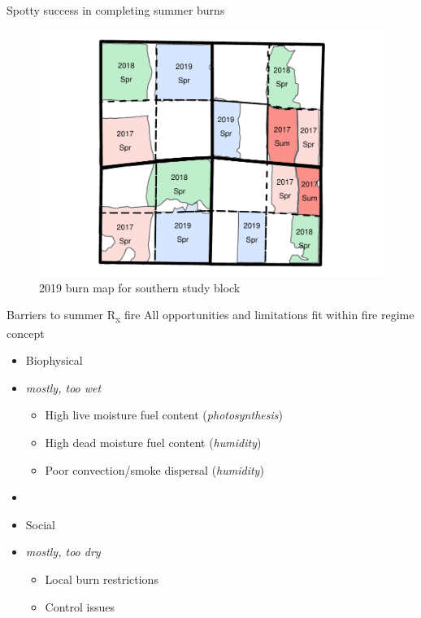 \documentclass[11pt]{beamer}
\begin{document}
\begin{frame}{Spotty success in completing summer burns}

	\begin{center}
		\begin{figure}
			\includegraphics[width=0.9\linewidth]{figs/BarkerBurns-1} 
			\caption{2019 burn map for southern study block}
		\end{figure}
	\end{center}
\end{frame}

\begin{frame}{Barriers to summer R\textsubscript{x} fire } 
	All opportunities and limitations fit within fire regime concept
	\begin{itemize}
		\item Biophysical 
		\item[] \emph{mostly, \alert{too wet}}
		\begin{itemize}
			\item High live moisture fuel content (\emph{photosynthesis})
			\item High dead moisture fuel content (\emph{humidity})
			\item Poor convection/smoke dispersal (\emph{humidity})
		\end{itemize}
		\item[]
		\item Social 
		\item[] \emph{mostly, \alert{too dry}}
		\begin{itemize}
			\item Local burn restrictions
			\item Control issues
		\end{itemize}
	\end{itemize}
	
\end{frame}
\end{document}
